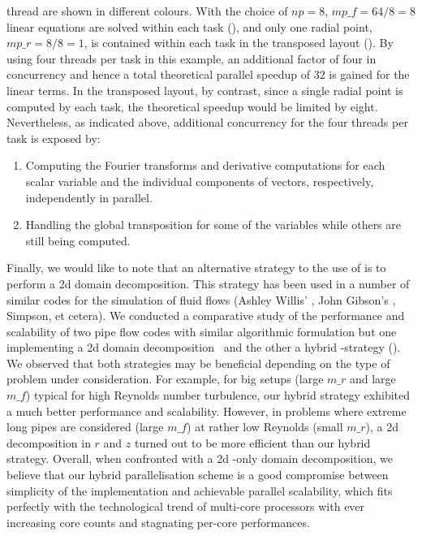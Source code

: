 \documentclass[a4paper, 11pt, DIV=11]{scrartcl}
\begin{document}
thread are shown in different colours. With the choice of $np=8$, $mp\_f=64/8=8$
linear equations are solved within each \mpi task (), and
only one radial point, $mp\_r=8/8=1$, is contained within each \mpi task in the
transposed layout (). By using four \omp threads per \mpi
task in this example, an additional factor of four in concurrency and hence a total
theoretical parallel speedup of \num{32} is gained for the linear terms. In the
transposed layout, by contrast, since a single radial point is computed by each
\mpi task, the theoretical speedup would be limited by eight. Nevertheless, as
indicated above, additional concurrency for the four \omp threads per \mpi task is
exposed by:
\begin{enumerate}
\item
Computing the Fourier transforms and derivative computations for each scalar
variable and the individual components of vectors, respectively, independently
in parallel.
\item
Handling the global \mpi transposition for some of the variables while others
are still being computed.
\end{enumerate}
Finally, we would like to note that an alternative strategy to the use of \omp is
to perform a 2d \mpi domain decomposition. This strategy has been used in a number
of similar codes for the simulation of fluid flows (\eg Ashley Willis' \opf
\cite{Willis2017}, John Gibson's \cf, Simpson, et cetera). We conducted a comparative
study of the performance and scalability of two pipe flow codes with similar algorithmic
formulation but one implementing a 2d \mpi domain decomposition~\cite{Willis2017} and
the other a hybrid \mpi-\omp strategy (\nsp). We observed that both strategies may be
beneficial depending on the type of problem under consideration. For example, for big
setups (\ie large $m\_r$ and large $m\_f$) typical for high Reynolds number turbulence,
our hybrid strategy exhibited a much better performance and scalability. However, in
problems where extreme long pipes are considered (\ie large $m\_f$) at rather low
Reynolds (\ie small $m\_r$), a 2d \mpi decomposition in $r$ and $z$ turned out to be
more efficient than our hybrid strategy. Overall, when confronted with a 2d \mpi-only
domain decomposition, we believe that our hybrid parallelisation scheme is a good
compromise between simplicity of the implementation and achievable parallel scalability,
which fits perfectly with the technological trend of multi-core processors with ever
increasing core counts and stagnating per-core performances.
\end{document}
